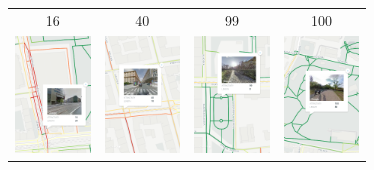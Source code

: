 \documentclass[border={5pt 1pt 5pt 5pt}, varwidth=38em]{standalone}
\begin{document}

\setlength{\tabcolsep}{0.1em}
{
\renewcommand{\arraystretch}{0.5}

\begin{table}[ht]
\centering
\begin{tabular}{cccc}
{\tiny 16} & {\tiny 40} & {\tiny 99} & {\tiny 100} \\
\includegraphics[width=20mm]{cuts400/osm_w64d2_16.png} & \includegraphics[width=20mm]{cuts400/osm_w64d2_40.png} & \includegraphics[width=20mm]{cuts400/osm_w64d2_99.png} & \includegraphics[width=20mm]{cuts400/osm_w64d2_100.png}\\
\end{tabular}
\end{table}

}
\end{document}
